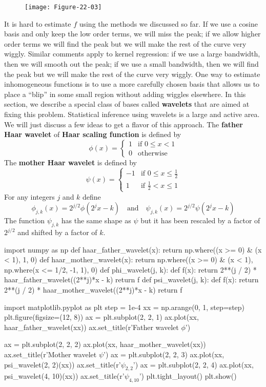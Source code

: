 \begin{figure}[H]
\centering
\texttt{[image: Figure-22-03]}
\end{figure}

It is hard to estimate \(f\) using the methods we discussed so far. If we
use a cosine basis and only keep the low order terms, we will miss the
peak; if we allow higher order terms we will find the peak but we will
make the rest of the curve very wiggly. Similar comments apply to kernel
regression: if we use a large bandwidth, then we will smooth out the
peak; if we use a small bandwidth, then we will find the peak but we
will make the rest of the curve very wiggly.
One way to estimate inhomogeneous functions is to use a more carefully
chosen basis that allows us to place a ``blip'' in some small region
without adding wiggles elsewhere. In this section, we describe a special
class of bases called \textbf{wavelets} that are aimed at fixing this
problem. Statistical inference using wavelets is a large and active
area. We will just discuss a few ideas to get a flavor of this approach.
The \textbf{father Haar wavelet} of \textbf{Haar scaling function} is
defined by
\[
\phi(x) = \begin{cases}
1 & \text{if } 0 \leq x < 1 \\
0 & \text{otherwise}
\end{cases}
\]
The \textbf{mother Haar wavelet} is defined by
\[
\psi(x) = \begin{cases}
-1 & \text{if } 0 \leq x \leq \frac{1}{2} \\
1  & \text{if } \frac{1}{2} < x \leq 1
\end{cases}
\]
For any integers \(j\) and \(k\) define
\[
\phi_{j, k}(x) = 2^{j/2} \phi(2^{j} x - k) 
\quad \text{and} \quad
\psi_{j, k}(x) = 2^{j/2} \psi(2^{j} x - k)
\]
The function \(\psi_{j, k}\) has the same shape as \(\psi\) but it has
been rescaled by a factor of \(2^{j/2}\) and shifted by a factor of
\(k\).

\begin{python}
import numpy as np
def haar_father_wavelet(x):
    return np.where((x >= 0) & (x < 1), 1, 0)
def haar_mother_wavelet(x):
    return np.where((x >= 0) & (x < 1),  np.where(x <= 1/2, -1, 1), 0)
def phi_wavelet(j, k):
    def f(x):
        return 2**(j / 2) * haar_father_wavelet((2**j)*x - k)
    return f
def psi_wavelet(j, k):
    def f(x):
        return 2**(j / 2) * haar_mother_wavelet((2**j)*x - k)
    return f
\end{python}

\begin{python}
import matplotlib.pyplot as plt
step = 1e-4
xx = np.arange(0, 1, step=step)
plt.figure(figsize=(12, 8))
ax = plt.subplot(2, 2, 1)
ax.plot(xx, haar_father_wavelet(xx))
ax.set_title(r'Father wavelet $\phi$')
    
ax = plt.subplot(2, 2, 2)
ax.plot(xx, haar_mother_wavelet(xx))
ax.set_title(r'Mother wavelet $\psi$')
ax = plt.subplot(2, 2, 3)
ax.plot(xx, psi_wavelet(2, 2)(xx))
ax.set_title(r'$\psi_{2, 2}$')
ax = plt.subplot(2, 2, 4)
ax.plot(xx, psi_wavelet(4, 10)(xx))
ax.set_title(r'$\psi_{4, 10}$')
plt.tight_layout()
plt.show()
\end{python}

